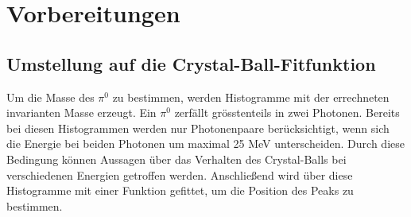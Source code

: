 \documentclass[a4paper,11pt,oneside,final,german,openbib,pdftex]{scrbook}
\begin{document}
{















\chapter{Vorbereitungen}
\label{chap:Vorbereitung}


\section{Umstellung auf die Crystal-Ball-Fitfunktion}
\label{sec:CB-Funktion}

Um die Masse des $\pi^0$ zu bestimmen, werden Histogramme mit der errechneten invarianten Masse erzeugt. Ein $\pi^0$ zerf\"allt gr\"o{ss}tenteils in zwei Photonen. Bereits bei diesen Histogrammen werden nur Photonenpaare ber\"ucksichtigt, wenn sich die Energie bei beiden Photonen um maximal 25 MeV unterscheiden. Durch diese Bedingung k\"onnen Aussagen \"uber das Verhalten des Crystal-Balls bei verschiedenen Energien getroffen werden.
 Anschlie{\ss}end wird \"uber diese Histogramme mit einer Funktion gefittet, um die Position des Peaks zu bestimmen.

}
\end{document}

